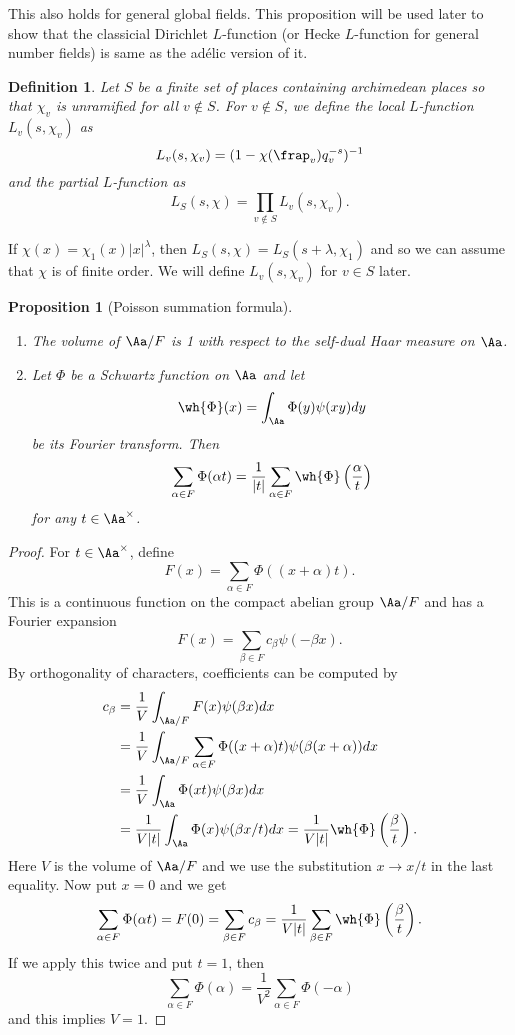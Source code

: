 \documentclass{article}
\newtheorem{definition}{Definition}[section]
\newtheorem{proposition}{Proposition}[section]
\begin{document}
This also holds for general global fields. 
This proposition will be used later to show that the classicial Dirichlet $L$-function (or Hecke $L$-function for general number fields) is same as the ad\'elic version of it. 

\begin{definition}
Let $S$ be a finite set of places containing archimedean places so that $\chi_{v}$ is unramified for all $v\not\in S$. For $v\not\in S$, we define the local $L$-function $L_{v}(s, \chi_{v})$ as 
$$
L_{v}(s, \chi_v) = (1-\chi(\frap_{v})q_{v}^{-s})^{-1}
$$
and the partial $L$-function as
$$
L_{S}(s, \chi) = \prod_{v\not\in S} L_{v}(s, \chi_{v}). 
$$
\end{definition}
If $\chi(x) = \chi_{1}(x)|x|^{\lambda}$, then $L_{S}(s, \chi) = L_{S}(s + \lambda, \chi_{1})$ and so we can assume that $\chi$ is of finite order. We will define $L_{v}(s, \chi_{v})$ for $v\in S$ later. 


\begin{proposition}[Poisson summation formula]
\begin{enumerate}
\item The volume of $\Aa/F$ is 1 with respect to the self-dual Haar measure on $\Aa$. 
\item Let $\Phi$ be a Schwartz function on $\Aa$ and let 
$$
\wh{\Phi}(x) = \int_{\Aa} \Phi(y) \psi(xy)dy
$$
be its Fourier transform. Then 
$$
\sum_{\alpha\in F} \Phi(\alpha t) = \frac{1}{|t|} \sum_{\alpha\in F} \wh{\Phi}\left(\frac{\alpha}{t}\right)
$$
for any $t\in \Aa^{\times}$. 
\end{enumerate}
\end{proposition}
\begin{proof}
For $t\in \Aa^{\times}$, define 
$$
F(x) = \sum_{\alpha\in F} \Phi((x+\alpha) t). 
$$
This is a continuous function on the compact abelian group $\Aa/F$ and has a Fourier expansion
$$
F(x) = \sum_{\beta\in F} c_{\beta} \psi(-\beta x).
$$
By orthogonality of characters, coefficients can be computed by 
\begin{align*}
c_{\beta} &= \frac{1}{V} \int_{\Aa/F} F(x) \psi(\beta x)dx \\
&= \frac{1}{V} \int_{\Aa/F} \sum_{\alpha\in F} \Phi((x+\alpha)t) \psi(\beta(x+\alpha)) dx \\
&= \frac{1}{V} \int_{\Aa} \Phi(xt)\psi(\beta x)dx \\
&=\frac{1}{V|t|} \int_{\Aa} \Phi(x)\psi(\beta x/t) dx = \frac{1}{V|t|} \wh{\Phi}\left(\frac{\beta}{t}\right).
\end{align*}
Here $V$ is the volume of $\Aa/F$ and we use the substitution $x \to x/t$ in the last equality. 
Now put $x =0$ and we get 
$$
\sum_{\alpha\in F} \Phi(\alpha t) = F(0) = \sum_{\beta\in F} c_{\beta}= \frac{1}{V|t|} \sum_{\beta\in F}\wh{\Phi}\left(\frac{\beta}{t}\right).
$$
If we apply this twice and put $t = 1$, then 
$$
\sum_{\alpha\in F} \Phi(\alpha) = \frac{1}{V^{2}} \sum_{\alpha\in F}\Phi(-\alpha)
$$
and this implies $V = 1$. 
\end{proof}
\end{document}
